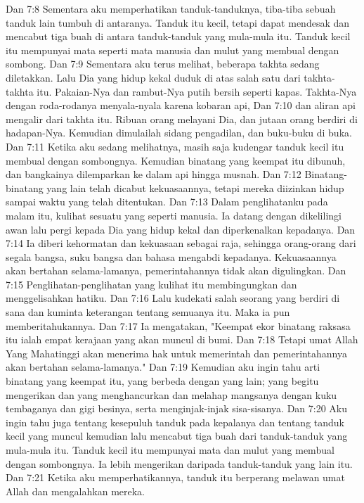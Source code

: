 Dan 7:8  Sementara aku memperhatikan tanduk-tanduknya, tiba-tiba sebuah tanduk lain tumbuh di antaranya. Tanduk itu kecil, tetapi dapat mendesak dan mencabut tiga buah di antara tanduk-tanduk yang mula-mula itu. Tanduk kecil itu mempunyai mata seperti mata manusia dan mulut yang membual dengan sombong.
Dan 7:9  Sementara aku terus melihat, beberapa takhta sedang diletakkan. Lalu Dia yang hidup kekal duduk di atas salah satu dari takhta-takhta itu. Pakaian-Nya dan rambut-Nya putih bersih seperti kapas. Takhta-Nya dengan roda-rodanya menyala-nyala karena kobaran api,
Dan 7:10  dan aliran api mengalir dari takhta itu. Ribuan orang melayani Dia, dan jutaan orang berdiri di hadapan-Nya. Kemudian dimulailah sidang pengadilan, dan buku-buku di buka.
Dan 7:11  Ketika aku sedang melihatnya, masih saja kudengar tanduk kecil itu membual dengan sombongnya. Kemudian binatang yang keempat itu dibunuh, dan bangkainya dilemparkan ke dalam api hingga musnah.
Dan 7:12  Binatang-binatang yang lain telah dicabut kekuasaannya, tetapi mereka diizinkan hidup sampai waktu yang telah ditentukan.
Dan 7:13  Dalam penglihatanku pada malam itu, kulihat sesuatu yang seperti manusia. Ia datang dengan dikelilingi awan lalu pergi kepada Dia yang hidup kekal dan diperkenalkan kepadanya.
Dan 7:14  Ia diberi kehormatan dan kekuasaan sebagai raja, sehingga orang-orang dari segala bangsa, suku bangsa dan bahasa mengabdi kepadanya. Kekuasaannya akan bertahan selama-lamanya, pemerintahannya tidak akan digulingkan.
Dan 7:15  Penglihatan-penglihatan yang kulihat itu membingungkan dan menggelisahkan hatiku.
Dan 7:16  Lalu kudekati salah seorang yang berdiri di sana dan kuminta keterangan tentang semuanya itu. Maka ia pun memberitahukannya.
Dan 7:17  Ia mengatakan, "Keempat ekor binatang raksasa itu ialah empat kerajaan yang akan muncul di bumi.
Dan 7:18  Tetapi umat Allah Yang Mahatinggi akan menerima hak untuk memerintah dan pemerintahannya akan bertahan selama-lamanya."
Dan 7:19  Kemudian aku ingin tahu arti binatang yang keempat itu, yang berbeda dengan yang lain; yang begitu mengerikan dan yang menghancurkan dan melahap mangsanya dengan kuku tembaganya dan gigi besinya, serta menginjak-injak sisa-sisanya.
Dan 7:20  Aku ingin tahu juga tentang kesepuluh tanduk pada kepalanya dan tentang tanduk kecil yang muncul kemudian lalu mencabut tiga buah dari tanduk-tanduk yang mula-mula itu. Tanduk kecil itu mempunyai mata dan mulut yang membual dengan sombongnya. Ia lebih mengerikan daripada tanduk-tanduk yang lain itu.
Dan 7:21  Ketika aku memperhatikannya, tanduk itu berperang melawan umat Allah dan mengalahkan mereka.

